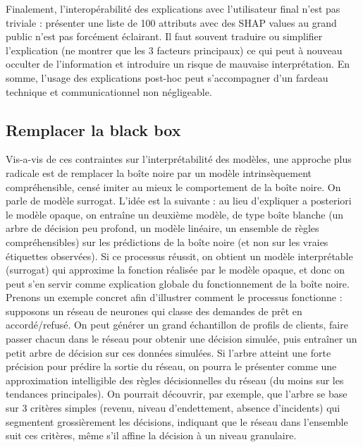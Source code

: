 \documentclass{article}
\begin{document}
    Finalement, l’interopérabilité des explications avec l’utilisateur final n’est pas triviale : présenter une liste de 100 attributs avec des SHAP values au grand public n’est pas forcément éclairant. Il faut souvent traduire ou simplifier l’explication (ne montrer que les 3 facteurs principaux) ce qui peut à nouveau occulter de l’information et introduire un risque de mauvaise interprétation. En somme, l’usage des explications post-hoc peut s’accompagner d’un fardeau technique et communicationnel non négligeable.

\subsection{Remplacer la black box}

\quad Vis-a-vis de ces contraintes sur l'interprétabilité des modèles, une approche plus radicale est de remplacer la boîte noire par un modèle intrinsèquement compréhensible, censé imiter au mieux le comportement de la boîte noire. On parle de modèle surrogat. L’idée est la suivante : au lieu d’expliquer a posteriori le modèle opaque, on entraîne un deuxième modèle, de type boîte blanche (un arbre de décision peu profond, un modèle linéaire, un ensemble de règles compréhensibles) sur les prédictions de la boîte noire (et non sur les vraies étiquettes observées). Si ce processus réussit, on obtient un modèle interprétable (surrogat) qui approxime la fonction réalisée par le modèle opaque, et donc on peut s’en servir comme explication globale du fonctionnement de la boîte noire.\\

Prenons un exemple concret afin d’illustrer comment le processus fonctionne : supposons un réseau de neurones qui classe des demandes de prêt en accordé/refusé. On peut générer un grand échantillon de profils de clients, faire passer chacun dans le réseau pour obtenir une décision simulée, puis entraîner un petit arbre de décision sur ces données simulées. Si l’arbre atteint une forte précision pour prédire la sortie du réseau, on pourra le présenter comme une approximation intelligible des règles décisionnelles du réseau (du moins sur les tendances principales). On pourrait découvrir, par exemple, que l’arbre se base sur 3 critères simples (revenu, niveau d’endettement, absence d’incidents) qui segmentent grossièrement les décisions, indiquant que le réseau dans l’ensemble suit ces critères, même s’il affine la décision à un niveau granulaire.\\
\end{document}
